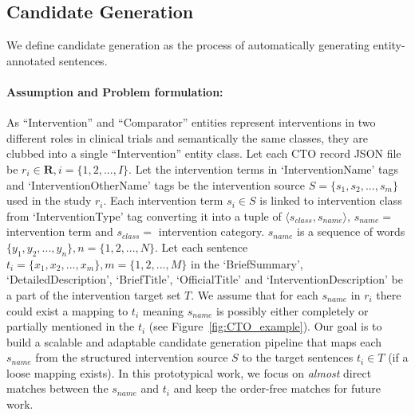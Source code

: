 \documentclass[11pt]{article}
\begin{document}
\subsection{Candidate Generation}
\label{subsec:candgen}
%
We define candidate generation as the process of automatically generating entity-annotated sentences.
%
\paragraph{Assumption and Problem formulation: }
As ``Intervention'' and ``Comparator'' entities represent interventions in two different roles in clinical trials and semantically the same classes, they are clubbed into a single ``Intervention'' entity class.
Let each CTO record JSON file be $r_i \in \boldsymbol{R}, i = \{ 1, 2, ... , I \}$.
Let the intervention terms in `InterventionName' tags and `InterventionOtherName' tags be the intervention source $S = \{ s_1, s_2, ... , s_m \}$ used in the study $r_i$.
Each intervention term $s_i \in S$ is linked to intervention class from `InterventionType' tag converting it into a tuple of $ \langle s_{class}, s_{name} \rangle$, $s_{name} =$ intervention term and $s_{class} =$ intervention category.
$s_{name}$ is a sequence of words $\{ y_1, y_2, ... , y_n \}, n = \{ 1, 2, ... , N \} $.
Let each sentence $t_i = \{ x_1, x_2, ... , x_m \}, m = \{ 1, 2, ... , M \}$ in the `BriefSummary', `DetailedDescription', `BriefTitle', `OfficialTitle' and `InterventionDescription' be a part of the intervention target set $T$.
We assume that for each $s_{name}$ in $r_i$ there could exist a mapping to $t_i$ meaning $s_{name}$ is possibly either completely or partially mentioned in the $t_i$ (see Figure~\ref{fig:CTO_example}).
Our goal is to build a scalable and adaptable candidate generation pipeline that maps each $s_{name}$ from the structured intervention source $S$ to the target sentences $t_i \in T$ (if a loose mapping exists).
In this prototypical work, we focus on \textit{almost} direct matches between the $s_{name}$ and $t_i$ and keep the order-free matches for future work.
%
%
\end{document}
